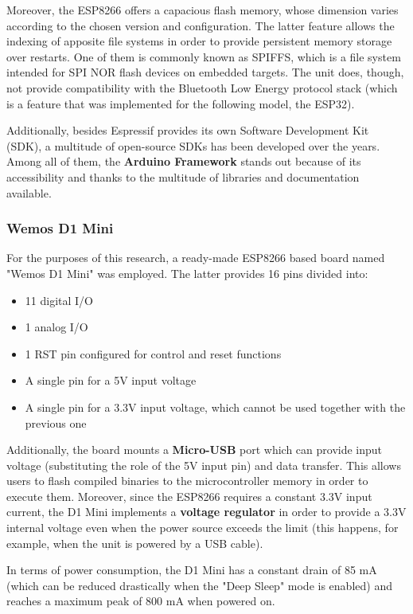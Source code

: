 Moreover, the ESP8266 offers a capacious flash memory, whose dimension varies according to the chosen version and configuration. The latter feature allows the indexing of apposite file systems in order to provide persistent memory storage over restarts. One of them is commonly known as SPIFFS, which is a file system intended for SPI NOR flash devices on embedded targets. The unit does, though, not provide compatibility with the Bluetooth Low Energy protocol stack (which is a feature that was implemented for the following model, the ESP32).

Additionally, besides Espressif provides its own Software Development Kit (SDK), a multitude of open-source SDKs has been developed over the years. Among all of them, the \textbf{Arduino Framework} stands out because of its accessibility and thanks to the multitude of libraries and documentation available. 

\subsubsection{Wemos D1 Mini}\label{subsubsec:d1mini}

For the purposes of this research, a ready-made ESP8266 based board named "Wemos D1 Mini" was employed. The latter provides 16 pins divided into:

\begin{itemize}
    \item 11 digital I/O
    \item 1 analog I/O
    \item 1 RST pin configured for control and reset functions
    \item A single pin for a 5V input voltage
    \item A single pin for a 3.3V input voltage, which cannot be used together with the previous one
\end{itemize}

Additionally, the board mounts a \textbf{Micro-USB} port which can provide input voltage (substituting the role of the 5V input pin) and data transfer. This allows users to flash compiled binaries to the microcontroller memory in order to execute them. Moreover, since the ESP8266 requires a constant 3.3V input current, the D1 Mini implements a \textbf{voltage regulator} in order to provide a 3.3V internal voltage even when the power source exceeds the limit (this happens, for example, when the unit is powered by a USB cable).

In terms of power consumption, the D1 Mini has a constant drain of 85 mA (which can be reduced drastically when the "Deep Sleep" mode is enabled) and reaches a maximum peak of 800 mA when powered on.

